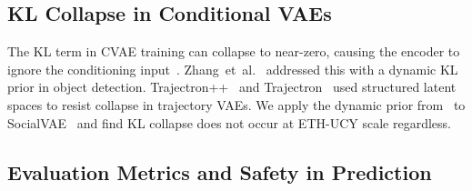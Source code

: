 \documentclass[journal]{IEEEtran}
\makeatletter
\newcommand{\etal}{et~al.\@}
\makeatother
\begin{document}
\subsection{KL Collapse in Conditional VAEs}

The KL term in CVAE training can collapse to near-zero, causing the
encoder to ignore the conditioning
input~\cite{lucas2019elbo}.
Zhang~\etal~\cite{zhang2025openworld} addressed this with a dynamic KL
prior in object detection.
Trajectron++~\cite{salzmann2020trajectron} and
Trajectron~\cite{ivanovic2019trajectron} used structured latent spaces
to resist collapse in trajectory VAEs.
We apply the dynamic prior from~\cite{zhang2025openworld} to
SocialVAE~\cite{xu2022socialvae} and find KL collapse does not occur
at ETH-UCY scale regardless.


\subsection{Evaluation Metrics and Safety in Prediction}
\end{document}
